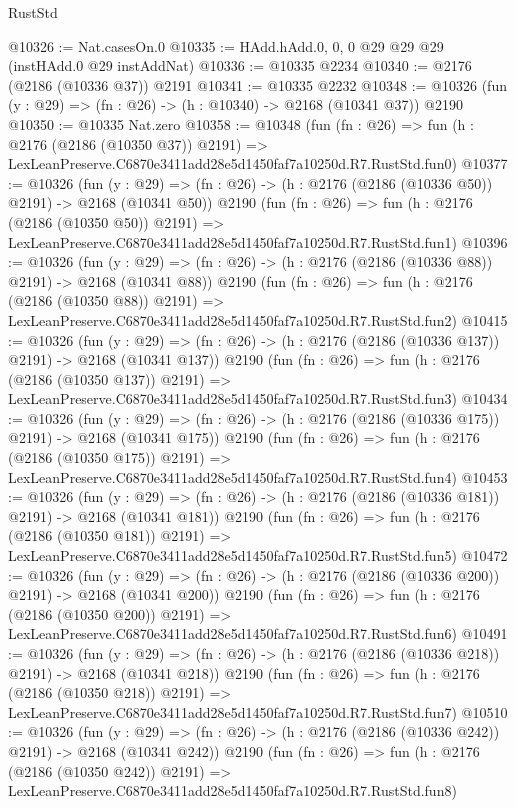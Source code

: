 \begin{lexlean}{RustStd}
\begin{coremodule}
@10326 := Nat.casesOn.{0}
@10335 := HAdd.hAdd.{0, 0, 0} @29 @29 @29 (instHAdd.{0} @29 instAddNat)
@10336 := @10335 @2234
@10340 := @2176 (@2186 (@10336 @37)) @2191
@10341 := @10335 @2232
@10348 := @10326 (fun (y : @29) => (fn : @26) -> (h : @10340) -> @2168 (@10341 @37)) @2190
@10350 := @10335 Nat.zero
@10358 := @10348
    (fun (fn : @26) =>
    fun (h : @2176 (@2186 (@10350 @37)) @2191) =>
    LexLeanPreserve.C6870e3411add28e5d1450faf7a10250d.R7.RustStd.fun0)
@10377 := @10326
    (fun (y : @29) => (fn : @26) -> (h : @2176 (@2186 (@10336 @50)) @2191) -> @2168 (@10341 @50))
    @2190
    (fun (fn : @26) =>
    fun (h : @2176 (@2186 (@10350 @50)) @2191) =>
    LexLeanPreserve.C6870e3411add28e5d1450faf7a10250d.R7.RustStd.fun1)
@10396 := @10326
    (fun (y : @29) => (fn : @26) -> (h : @2176 (@2186 (@10336 @88)) @2191) -> @2168 (@10341 @88))
    @2190
    (fun (fn : @26) =>
    fun (h : @2176 (@2186 (@10350 @88)) @2191) =>
    LexLeanPreserve.C6870e3411add28e5d1450faf7a10250d.R7.RustStd.fun2)
@10415 := @10326
    (fun (y : @29) => (fn : @26) -> (h : @2176 (@2186 (@10336 @137)) @2191) -> @2168 (@10341 @137))
    @2190
    (fun (fn : @26) =>
    fun (h : @2176 (@2186 (@10350 @137)) @2191) =>
    LexLeanPreserve.C6870e3411add28e5d1450faf7a10250d.R7.RustStd.fun3)
@10434 := @10326
    (fun (y : @29) => (fn : @26) -> (h : @2176 (@2186 (@10336 @175)) @2191) -> @2168 (@10341 @175))
    @2190
    (fun (fn : @26) =>
    fun (h : @2176 (@2186 (@10350 @175)) @2191) =>
    LexLeanPreserve.C6870e3411add28e5d1450faf7a10250d.R7.RustStd.fun4)
@10453 := @10326
    (fun (y : @29) => (fn : @26) -> (h : @2176 (@2186 (@10336 @181)) @2191) -> @2168 (@10341 @181))
    @2190
    (fun (fn : @26) =>
    fun (h : @2176 (@2186 (@10350 @181)) @2191) =>
    LexLeanPreserve.C6870e3411add28e5d1450faf7a10250d.R7.RustStd.fun5)
@10472 := @10326
    (fun (y : @29) => (fn : @26) -> (h : @2176 (@2186 (@10336 @200)) @2191) -> @2168 (@10341 @200))
    @2190
    (fun (fn : @26) =>
    fun (h : @2176 (@2186 (@10350 @200)) @2191) =>
    LexLeanPreserve.C6870e3411add28e5d1450faf7a10250d.R7.RustStd.fun6)
@10491 := @10326
    (fun (y : @29) => (fn : @26) -> (h : @2176 (@2186 (@10336 @218)) @2191) -> @2168 (@10341 @218))
    @2190
    (fun (fn : @26) =>
    fun (h : @2176 (@2186 (@10350 @218)) @2191) =>
    LexLeanPreserve.C6870e3411add28e5d1450faf7a10250d.R7.RustStd.fun7)
@10510 := @10326
    (fun (y : @29) => (fn : @26) -> (h : @2176 (@2186 (@10336 @242)) @2191) -> @2168 (@10341 @242))
    @2190
    (fun (fn : @26) =>
    fun (h : @2176 (@2186 (@10350 @242)) @2191) =>
    LexLeanPreserve.C6870e3411add28e5d1450faf7a10250d.R7.RustStd.fun8)

\end{coremodule}
\end{lexlean}
